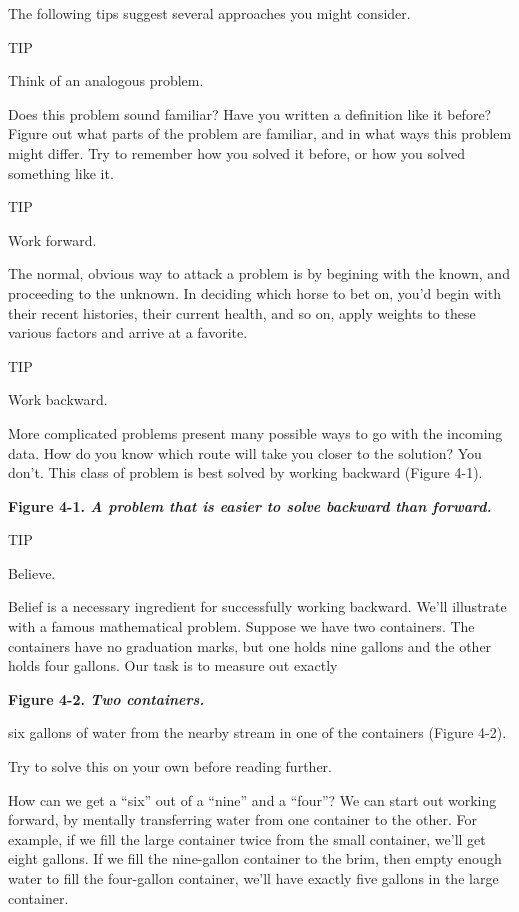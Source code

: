 The following tips suggest several approaches you might consider.

TIP

Think of an analogous problem.

Does this problem sound familiar? Have you written a definition like it
before? Figure out what parts of the problem are familiar, and in what
ways this problem might differ. Try to remember how you solved it
before, or how you solved something like it.

TIP

Work forward.

The normal, obvious way to attack a problem is by begining with the
known, and proceeding to the unknown. In deciding which horse to bet
on, you'd begin with their recent histories, their current health, and so on,
apply weights to these various factors and arrive at a favorite.

TIP

Work backward.

More complicated problems present many possible ways to go with the
incoming data. How do you know which route will take you closer to the
solution? You don't. This class of problem is best solved by working
backward (Figure 4-1).

\bf{Figure 4-1.} \emph{A problem that is easier to solve backward than
forward.}


TIP

Believe.

Belief is a necessary ingredient for successfully working backward. We'll
illustrate with a famous mathematical problem. Suppose we have two
containers. The containers have no graduation marks, but one holds nine
gallons and the other holds four gallons. Our task is to measure out exactly

\bf{Figure 4-2.} \emph{Two containers.}


six gallons of water from the nearby stream in one of the containers
(Figure 4-2).

Try to solve this on your own before reading further.

How can we get a ``six'' out of a ``nine'' and a ``four''? We can start
out working forward, by mentally transferring water from one container
to the other. For example, if we fill the large container twice from the
small container, we'll get eight gallons. If we fill the nine-gallon container
to the brim, then empty enough water to fill the four-gallon container,
we'll have exactly five gallons in the large container.

